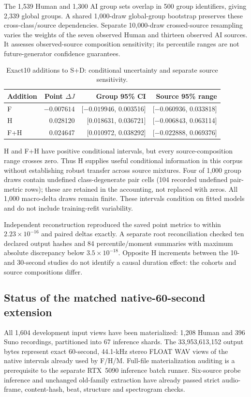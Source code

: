 The 1,539 Human and 1,300 AI group sets overlap in 500 group identifiers,
giving 2,339 global groups. A shared 1,000-draw global-group bootstrap preserves
these cross-class/source dependencies. Separate 10,000-draw crossed-source
resampling varies the weights of the seven observed Human and thirteen
observed AI sources. It assesses observed-source composition sensitivity;
its percentile ranges are not future-generator confidence guarantees.

\begin{table}[htbp]
\centering\small
\caption{Exact10 additions to S+D: conditional uncertainty and separate source sensitivity.}
\label{tab:exact10-uncertainty-v2}
\begin{tabular}{lrrr}
\toprule
Addition & Point $\Delta J$ & Group 95\% CI & Source 95\% range \\
\midrule
F & $-0.007614$ & [$-0.019946$, 0.003516] & [$-0.060936$, 0.033818] \\
H & 0.028120 & [0.018631, 0.036721] & [$-0.006843$, 0.063114] \\
F+H & 0.024647 & [0.010972, 0.038292] & [$-0.022888$, 0.069376] \\
\bottomrule
\end{tabular}
\end{table}

H and F+H have positive conditional intervals, but every source-composition
range crosses zero. Thus H supplies useful conditional information in this
corpus without establishing robust transfer across source mixtures. Four of
1,000 group draws contain undefined class-degenerate pair cells (104 recorded
undefined pair-metric rows); these are retained in the accounting, not replaced
with zeros. All 1,000 macro-delta draws remain finite. These intervals condition
on fitted models and do not include training-refit variability.

Independent reconstruction reproduced the saved point metrics to within
$2.23\times10^{-16}$ and paired deltas exactly. A separate root reconciliation
checked ten declared output hashes and 84 percentile/moment summaries with
maximum absolute discrepancy below $3.5\times10^{-18}$. Opposite H increments
between the 10- and 30-second studies do not identify a causal duration effect:
the cohorts and source compositions differ.



\subsection{Status of the matched native-60-second extension}
All 1,604 development input views have been materialized: 1,208 Human and
396 Suno recordings, partitioned into 67 inference shards. The 33,953,613,152
output bytes represent exact 60-second, 44.1-kHz stereo FLOAT WAV views of
the native intervals already used by F/H/M. Full-file materialization auditing
is a prerequisite to the separate RTX~5090 inference batch runner. Six-source
probe inference and unchanged old-family extraction have already passed strict
audio-frame, content-hash, beat, structure and spectrogram checks.

